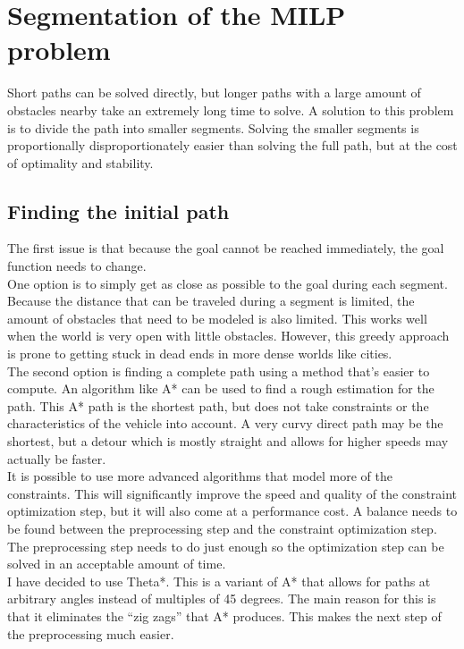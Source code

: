 \section{Segmentation of the MILP problem}
\label{section:segment}

Short paths can be solved directly, but longer paths with a large amount of obstacles nearby take an extremely long time to solve. A solution to this problem is to divide the path into smaller segments. Solving the smaller segments is proportionally disproportionately easier than solving the full path, but at the cost of optimality and stability.
\\
\subsection{Finding the initial path}
The first issue is that because the goal cannot be reached immediately, the goal function needs to change.  \\
One option is to simply get as close as possible to the goal during each segment. Because the distance that can be traveled during a segment is limited, the amount of obstacles that need to be modeled is also limited. This works well when the world is very open with little obstacles. However, this greedy approach is prone to getting stuck in dead ends in more dense worlds like cities.
\\
The second option is finding a complete path using a method that's easier to compute. An algorithm like A* can be used to find a rough estimation for the path. This A* path is the shortest path, but does not take constraints or the characteristics of the vehicle into account. A very curvy direct path may be the shortest, but a detour which is mostly straight and allows for higher speeds may actually be faster. 
\\
It is possible to use more advanced algorithms that model more of the constraints. This will significantly improve the speed and quality of the constraint optimization step, but it will also come at a performance cost. A balance needs to be found between the preprocessing step and the constraint optimization step. The preprocessing step needs to do just enough so the optimization step can be solved in an acceptable amount of time. 
\\
I have decided to use Theta*. This is a variant  of A* that allows for paths at arbitrary angles instead of multiples of 45 degrees. The main reason for this is that it eliminates the ``zig zags'' that A* produces. This makes the next step of the preprocessing much easier.\\
